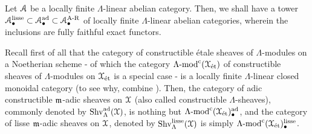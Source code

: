                 \begin{proposition} \label{prop: adic_categories_are_linear_and_abelian}
                    Let $\mathcal{A}$ be a locally finite $\Lambda$-linear abelian category. Then, we shall have a tower $\mathcal{A}_{\bullet}^{\mathrm{lisse}} \subset \mathcal{A}_{\bullet}^{\mathrm{ad}} \subset \mathcal{A}_{\bullet}^{\mathrm{A\text{-}R}}$ of locally finite $\Lambda$-linear abelian categories, wherein the inclusions are fully faithful exact functors.
                \end{proposition}
                \begin{example} \label{example: adic_sheaves}
                    Recall first of all that the category of constructible \'etale sheaves of $\Lambda$-modules on a Noetherian scheme - of which the category $\Lambda\text{-}\mathrm{mod}^{\mathrm{c}}(\mathcal{X}_{\mathrm{\acute{e}t}})$ of constructible sheaves of $\Lambda$-modules on $\mathcal{X}_{\mathrm{\acute{e}t}}$ is a special case - is a locally finite $\Lambda$-linear closed monoidal category (to see why, combine \cite[Propositions 3.20 and 3.22]{behrend_l_adic_sheaves_for_algebraic_stacks}). Then, the category of adic constructible $\mathfrak{m}$-adic sheaves on $\mathcal{X}$ (also called constructible $\Lambda$-sheaves), commonly denoted by $\mathrm{Shv}_{\Lambda}^{\mathrm{ad}}(\mathcal{X})$, is nothing but $\Lambda\text{-}\mathrm{mod}^{\mathrm{c}}(\mathcal{X}_{\mathrm{\acute{e}t}})_{\bullet}^{\mathrm{ad}}$, and the category of lisse $\mathfrak{m}$-adic sheaves on $\mathcal{X}$, denoted by $\mathrm{Shv}_{\Lambda}^{\mathrm{lisse}}(\mathcal{X})$ is simply $\Lambda\text{-}\mathrm{mod}^{\mathrm{c}}(\mathcal{X}_{\mathrm{\acute{e}t}})_{\bullet}^{\mathrm{lisse}}$.
                \end{example}
                
